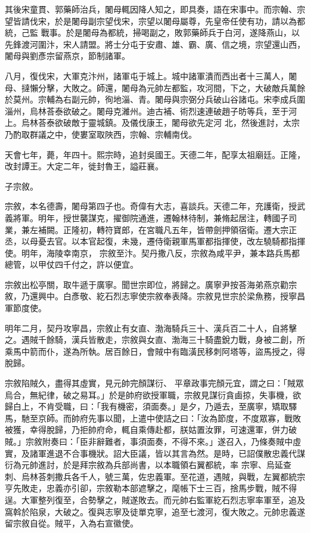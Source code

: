 \begin{pinyinscope}
 其後宋童貫、郭藥師治兵，闍母輒因降人知之，即具奏，語在宋事中。而宗翰、宗望皆請伐宋，於是闍母副宗望伐宋，宗望以闍母屬尊，先皇帝任使有功，請以為都統，己監
 戰事。於是闍母為都統，掃喝副之，敗郭藥師兵于白河，遂降燕山，以先鋒渡河圍汴，宋人請盟。將士分屯于安肅、雄、霸、廣、信之境，宗望還山西，闍母與劉彥宗留燕京，節制諸軍。



 八月，復伐宋，大軍克汴州，諸軍屯于城上。城中諸軍潰而西出者十三萬人，闍母、撻懶分擊，大敗之。師還，闍母為元帥左都監，攻河間，下之，大破敵兵萬餘於莫州。宗輔為右副元帥，徇地淄、青。闍母與宗弼分兵破山谷諸屯。宋李成兵圍淄州，烏林荅泰欲破之。闍母克濰州。迪古補、術烈速連破趙子昉等兵，至于河上。烏林荅泰欲破敵于靈城鎮。及儀伐康王，闍母欲先定河
 北，然後進討，太宗乃酌取群議之中，使婁室取陜西，宗翰、宗輔南伐。



 天會七年，薨，年四十。熙宗時，追封吳國王。天德二年，配享太祖廟廷。正隆，改封譚王。大定二年，徙封魯王，謚莊襄。



 子宗敘。



 宗敘，本名德壽，闍母第四子也。奇偉有大志，喜談兵。天德二年，充護衛，授武義將軍。明年，授世襲謀克，擢御院通進，遷翰林待制，兼脩起居注，轉國子司業，兼左補闕。正隆初，轉符寶郎，在宮職凡五年，皆帶劍押領宿衛。遷大宗正丞，以母憂去官。以本官起復，未幾，遷侍衛親軍馬軍都指揮使，改左驍騎都指揮使。明年，海陵幸南京，
 宗敘至汴。契丹撒八反，宗敘為咸平尹，兼本路兵馬都總管，以甲仗四千付之，許以便宜。



 宗敘出松亭關，取牛遞于廣寧。聞世宗即位，將歸之。廣寧尹按荅海弟燕京勸宗敘，乃還興中。白彥敬、紇石烈志寧使宗敘奉表降。宗敘見世宗於梁魚務，授寧昌軍節度使。



 明年二月，契丹攻寧昌，宗敘止有女直、渤海騎兵三十、漢兵百二十人，自將擊之。遇賊千餘騎，漢兵皆散走，宗敘與女直、渤海三十騎盡銳力戰，身被二創，所乘馬中箭而仆，遂為所執。居百餘日，會賊中有臨潢民移刺阿塔等，盜馬授之，得脫歸。



 宗敘陷賊久，盡得其虛實，見元帥完顏謀衍、
 平章政事完顏元宜，謂之曰：「賊眾烏合，無紀律，破之易耳。」於是帥府欲授軍職，宗敘見謀衍貪鹵掠，失事機，欲歸白上，不肯受職，曰：「我有機密，須面奏。」是夕，乃遁去，至廣寧，矯取驛馬，馳至京師。而帥府先事以聞，上遣中使詰之曰：「汝為節度，不度眾寡，戰敗被獲，幸得脫歸，乃拒帥府命，輒自乘傳赴都，朕姑置汝罪，可速還軍，併力破賊。」宗敘附奏曰：「臣非辭難者，事須面奏，不得不來。」遂召入，乃條奏賊中虛實，及諸軍進退不合事機狀。詔大臣議，皆以其言為然。是時，已詔僕散忠義代謀衍為元帥進討，於是拜宗敘為兵部尚書，以本職領右翼都統，率
 宗寧、烏延查刺、烏林荅刺撒兵各千人，號三萬，佐忠義軍。至花道，遇賊，與戰，左翼都統宗亨先敗走，忠義亦引卻，宗敘勒本部遮擊之，麾帳下士三百，捨馬步戰，賊不得逞。大軍整列復至，合勢擊之，賊遂敗去。而元帥右監軍紇石烈志寧率軍至，追及窩斡於陷泉，大破之。復與志寧及徒單克寧，追至七渡河，復大敗之。元帥忠義遂留宗敘自從。賊平，入為右宣徽使。




\end{pinyinscope}

